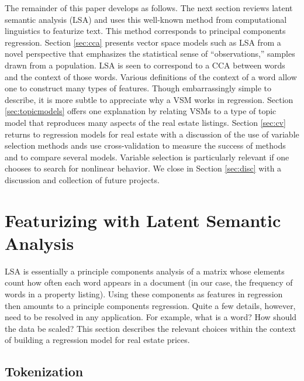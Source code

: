 \documentclass[12pt]{article}
\begin{document}
 The remainder of this paper develops as follows.  The next section reviews
 latent semantic analysis (LSA) and uses this well-known method from
 computational linguistics to featurize text.  This method corresponds to
 principal components regression.  Section \ref{sec:cca} presents vector space
 models such as LSA from a novel perspective that emphasizes the statistical sense 
 of ``observations,'' samples drawn from a population.  LSA is seen to
 correspond to a CCA between words and the context of those words.  Various definitions of the
 context of a word allow one to construct many types of features.  Though
 embarrassingly simple to describe, it is more subtle to appreciate why a
 VSM works in regression.  Section \ref{sec:topicmodels} offers one
 explanation by relating VSMs to a type of topic model that reproduces many aspects of the real estate listings.  Section \ref{sec:cv} returns to regression models for real
 estate with a discussion of the use of variable selection methods ands use
 cross-validation to measure the success of methods and to compare several
 models.  Variable selection is particularly relevant if one chooses to search
 for nonlinear behavior.  We close in Section \ref{sec:disc} with a discussion
 and collection of future projects.



\section{Featurizing with Latent Semantic Analysis}
\label{sec:lsa}

 LSA is essentially a principle components analysis
 of a matrix whose elements count how often each word appears in a document (in our
 case, the frequency of words in a property listing).  Using these components as
 features in regression then amounts to a principle components regression.
  Quite a few details, however, need to be resolved in any application. For
 example, what is a word?  How should the data be scaled? 
 This section describes the relevant choices within
 the context of building a regression model for real estate prices.
 
 \subsection{ Tokenization }  %
\end{document}
